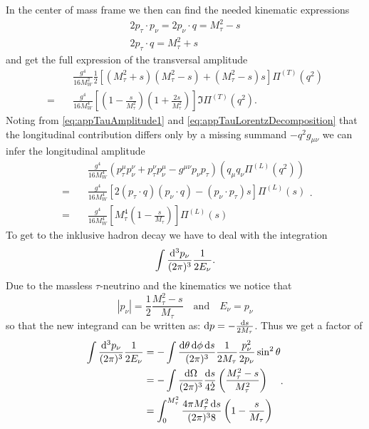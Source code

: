 In the center of mass frame we then can find the needed kinematic expressions
\begin{align}
	2 p_\tau \cdot p_\nu = 2 p_\nu \cdot q = M^2_\tau - s \\
	2 p_\tau \cdot q = M_\tau^2 + s
\end{align}
and get the full expression of the transversal amplitude
\begin{equation}
	\begin{split}
		&\frac{g^4}{16 M_W^2} \frac{1}{2} \left[(M_\tau^2 + s)(M_\tau^2 -s) + (M_\tau^2-s)s\right] \Pi^{(T)} (q^2) \\
		=\quad& \frac{g^4}{16 M_W^4} \left[\left(1-\frac{s}{M_\tau^2}\right)\left(1+\frac{2s}{M_\tau^2}\right)\right] \Im \Pi^{(T)}(q^2).
	\end{split}
\end{equation}
Noting from \eqref{eq:appTauAmplitude1} and \eqref{eq:appTauLorentzDecomposition} that the longitudinal contribution differs only by a missing summand $-q^2 g_{\mu\nu}$ we can infer the longitudinal amplitude
\begin{equation}
	\begin{split}
	&\frac{g^4}{16 M_W^4} (p_\tau^\mu p_\nu^\nu + p_\tau^\nu p_\nu^\mu - g^{\mu\nu} p_\nu p_\tau)(q_\mu q_\nu \Pi^{(L)}(q^2)) \\
	 =\quad & \frac{g^4}{16 M_W^4} [ 2 (p_\tau \cdot q)(p_\nu \cdot q) - (p_\nu \cdot p_\tau)s ] \Pi^{(L)}(s) \\
	 =\quad & \frac{g^4}{16 M_W^4} \left[ M_\tau^4 \left(1 - \frac{s}{M_\tau} \right) \right] \Pi^{(L)}(s)
	\end{split}.
\end{equation}
To get to the inklusive hadron decay we have to deal with the integration
\begin{equation}
	\int \frac{\mathop{}\!\mathrm{d^3} p_{\nu}}{(2\pi)^3} \frac{1}{2E_{\nu}}.
\end{equation}
Due to the massless $\tau$-neutrino and the kinematics we notice that 
\begin{equation}
	|p_\nu| = \frac{1}{2} \frac{M_\tau^2-s}{M_\tau} \quad \text{and} \quad E_\nu = p_\nu
\end{equation}
so that the new integrand can be written as: $\mathop{}\!\mathrm{d} p = - \frac{\mathop{}\!\mathrm{d} s}{2 M_\tau}$. Thus we get a factor of
\begin{equation}
	\begin{split}
		\int \frac{\mathop{}\!\mathrm{d^3} p_{\nu}}{(2\pi)^3} \frac{1}{2E_{\nu}} &= -\int \frac{\mathop{}\!\mathrm{d} \theta \mathop{}\!\mathrm{d} \phi \mathop{}\!\mathrm{d} s}{(2\pi)^3} \frac{1}{2 M_\tau} \frac{p_\nu^2}{2 p_\nu} \sin^2 \theta \\
		&= - \int \frac{\mathop{}\!\mathrm{d} \Omega}{(2\pi)^3} \frac{\mathop{}\!\mathrm{d} s}{4 \dot 2} \left(\frac{M_\tau^2 - s}{M_\tau^2}\right) \\
		&= \int_0^{M_\tau^2} \frac{4\pi M_\tau^2 \mathop{}\!\mathrm{d} s}{(2 \pi)^3 8} \left( 1 - \frac{s}{M_\tau} \right)
	\end{split}.
\end{equation}

